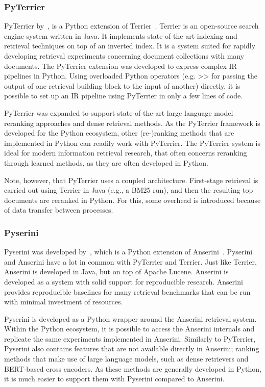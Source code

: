 \subsubsection{PyTerrier}
PyTerrier by~\citet{pyterrier}, is a Python extension of Terrier~\citep{terrier}. Terrier is an open-source search engine system written in Java. It implements state-of-the-art indexing and retrieval techniques on top of an inverted index. It is a system suited for rapidly developing retrieval experiments concerning document collections with many documents. 
The PyTerrier extension was developed to express complex IR pipelines in Python. Using overloaded Python operators (e.g. >> for passing the output of one retrieval building block to the input of another) directly, it is possible to set up an IR pipeline using PyTerrier in only a few lines of code. 

PyTerrier was expanded to support state-of-the-art large language model reranking approaches and dense retrieval methods. As the PyTerrier framework is developed for the Python ecosystem, other (re-)ranking methods that are implemented in Python can readily work with PyTerrier. The PyTerrier system is ideal for modern information retrieval research, that often concerns reranking through learned methods, as they are often developed in Python.

Note, however, that PyTerrier uses a coupled architecture. First-stage retrieval is carried out using Terrier in Java (e.g., a BM25 run), and then the resulting top documents are reranked in Python. For this, some overhead is introduced because of data transfer between processes. 

\subsubsection{Pyserini}
Pyserini was developed by~\citet{pyserini}, which is a Python extension of Anserini~\citep{anserini}. Pyserini and Anserini have a lot in common with PyTerrier and Terrier. Just like Terrier, Anserini is developed in Java, but on top of Apache Lucene. Anserini is developed as a system with solid support for reproducible research. Anserini provides reproducible baselines for many retrieval benchmarks that can be run with minimal investment of resources. 

Pyserini is developed as a Python wrapper around the Anserini retrieval system. Within the Python ecosystem, it is possible to access the Anserini internals and replicate the same experiments implemented in Anserini. Similarly to PyTerrier, Pyserini also contains features that are not available directly in Anserini; ranking methods that make use of large language models, such as dense retrievers and BERT-based cross encoders. As these methods are generally developed in Python, it is much easier to support them with Pyserini compared to Anserini.

